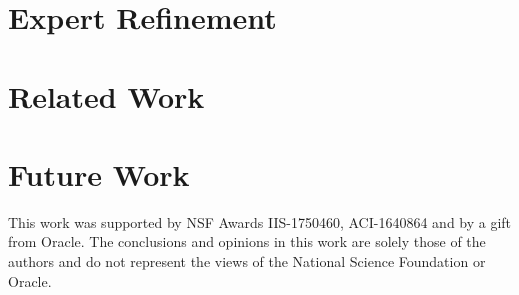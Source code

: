 \documentclass[manuscript]{acmart}
\begin{document}
\section{Expert Refinement}
\label{sec:expertui}


\section{Related Work}
\label{sec:related}
 

\section{Future Work}
\label{sec:future}


\begin{acks}
This work was supported by NSF Awards IIS-1750460, ACI-1640864 and by a gift from Oracle.
The conclusions and opinions in this work are solely those of the
authors and do not represent the views of the National Science Foundation or Oracle.
\end{acks}



\end{document}

